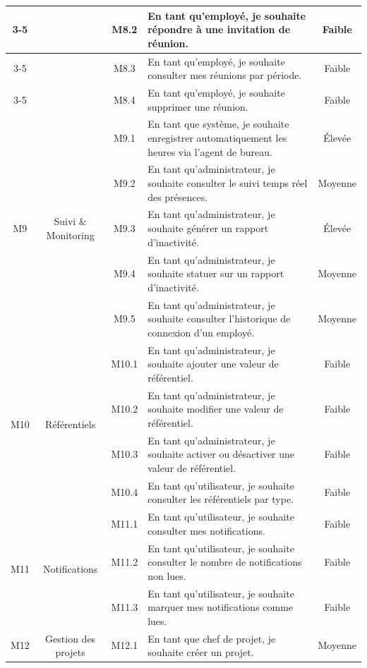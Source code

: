 \begin{longtable}{|c|c|c|p{7.2cm}|c|}
\cline{3-5}
 & & M8.2 & En tant qu'employé, je souhaite répondre à une invitation de réunion. & Faible \\
\cline{3-5}
 & & M8.3 & En tant qu'employé, je souhaite consulter mes réunions par période. & Faible \\
\cline{3-5}
 & & M8.4 & En tant qu'employé, je souhaite supprimer une réunion. & Faible \\
\hline
\multirow{5}{*}{M9} & \multirow{5}{*}{Suivi \& Monitoring} & M9.1 & En tant que système, je souhaite enregistrer automatiquement les heures via l'agent de bureau. & Élevée \\
\cline{3-5}
 & & M9.2 & En tant qu'administrateur, je souhaite consulter le suivi temps réel des présences. & Moyenne \\
\cline{3-5}
 & & M9.3 & En tant qu'administrateur, je souhaite générer un rapport d'inactivité. & Élevée \\
\cline{3-5}
 & & M9.4 & En tant qu'administrateur, je souhaite statuer sur un rapport d'inactivité. & Moyenne \\
\cline{3-5}
 & & M9.5 & En tant qu'administrateur, je souhaite consulter l'historique de connexion d'un employé. & Moyenne \\
\hline
\multirow{4}{*}{M10} & \multirow{4}{*}{Référentiels} & M10.1 & En tant qu'administrateur, je souhaite ajouter une valeur de référentiel. & Faible \\
\cline{3-5}
 & & M10.2 & En tant qu'administrateur, je souhaite modifier une valeur de référentiel. & Faible \\
\cline{3-5}
 & & M10.3 & En tant qu'administrateur, je souhaite activer ou désactiver une valeur de référentiel. & Faible \\
\cline{3-5}
 & & M10.4 & En tant qu'utilisateur, je souhaite consulter les référentiels par type. & Faible \\
\hline
\multirow{3}{*}{M11} & \multirow{3}{*}{Notifications} & M11.1 & En tant qu'utilisateur, je souhaite consulter mes notifications. & Faible \\
\cline{3-5}
 & & M11.2 & En tant qu'utilisateur, je souhaite consulter le nombre de notifications non lues. & Faible \\
\cline{3-5}
 & & M11.3 & En tant qu'utilisateur, je souhaite marquer mes notifications comme lues. & Faible \\
\hline
\multirow{9}{*}{M12} & \multirow{9}{*}{Gestion des projets} & M12.1 & En tant que chef de projet, je souhaite créer un projet. & Moyenne \\

\end{longtable}
